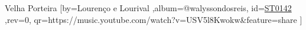 \beginsong
{Velha Porteira %
}[by={Lourenço e Lourival %
},album={@walyssondosreis},
id={\href{https://music.youtube.com/watch?v=USV5l8Kwokw&feature=share %
}{ST0142 %
}},rev={0}, %
qr={https://music.youtube.com/watch?v=USV5l8Kwokw&feature=share %
}]
\beginverse
